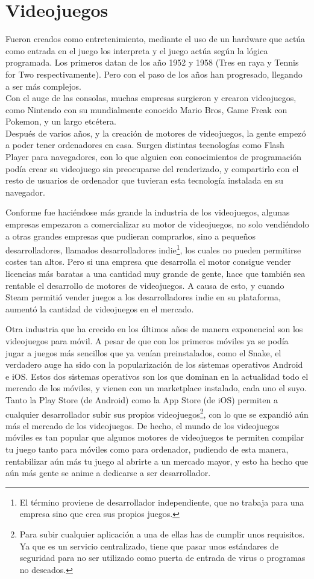 \section{Videojuegos}
Fueron creados como entretenimiento, mediante el uso de un hardware que actúa como entrada en el juego los interpreta y el juego actúa según la lógica programada. Los primeros datan de los año 1952 y 1958 (Tres en raya y Tennis for Two respectivamente). Pero con el paso de los años han progresado, llegando a ser más complejos. 
\\
Con el auge de las consolas, muchas empresas surgieron y crearon videojuegos, como Nintendo con su mundialmente conocido Mario Bros, Game Freak con Pokemon, y un largo etcétera. 
\\
Después de varios años, y la creación de motores de videojuegos, la gente empezó a poder tener ordenadores en casa. Surgen distintas tecnologías como Flash Player para navegadores, con lo que alguien con conocimientos de programación podía crear su videojuego sin preocuparse del renderizado, y compartirlo con el resto de usuarios de ordenador que tuvieran esta tecnología instalada en su navegador.

Conforme fue haciéndose más grande la industria de los videojuegos, algunas empresas empezaron a comercializar su motor de videojuegos, no solo vendiéndolo a otras grandes empresas que pudieran comprarlos, sino a pequeños desarrolladores, llamados desarrolladores indie\footnote{El término proviene de desarrollador independiente, que no trabaja para una empresa sino que crea sus propios juegos.}, los cuales no pueden permitirse costes tan altos. Pero si una empresa que desarrolla el motor consigue vender licencias más baratas a una cantidad muy grande de gente, hace que también sea rentable el desarrollo de motores de videojuegos. A causa de esto, y cuando Steam permitió vender juegos a los desarrolladores indie en su plataforma, aumentó la cantidad de videojuegos en el mercado.

Otra industria que ha crecido en los últimos años de manera exponencial son los videojuegos para móvil. A pesar de que con los primeros móviles ya se podía jugar a juegos más sencillos que ya venían preinstalados, como el Snake, el verdadero auge ha sido con la popularización de los sistemas operativos Android e iOS. Estos dos sistemas operativos son los que dominan en la actualidad todo el mercado de los móviles, y vienen con un marketplace instalado, cada uno el suyo. Tanto la Play Store (de Android) como la App Store (de iOS) permiten a cualquier desarrollador subir sus propios videojuegos\footnote{Para subir cualquier aplicación a una de ellas has de cumplir unos requisitos. Ya que es un servicio centralizado, tiene que pasar unos estándares de seguridad para no ser utilizado como puerta de entrada de virus o programas no deseados.}, con lo que se expandió aún más el mercado de los videojuegos. De hecho, el mundo de los videojuegos móviles es tan popular que algunos motores de videojuegos te permiten compilar tu juego tanto para móviles como para ordenador, pudiendo de esta manera, rentabilizar aún más tu juego al abrirte a un mercado mayor, y esto ha hecho que aún más gente se anime a dedicarse a ser desarrollador.

